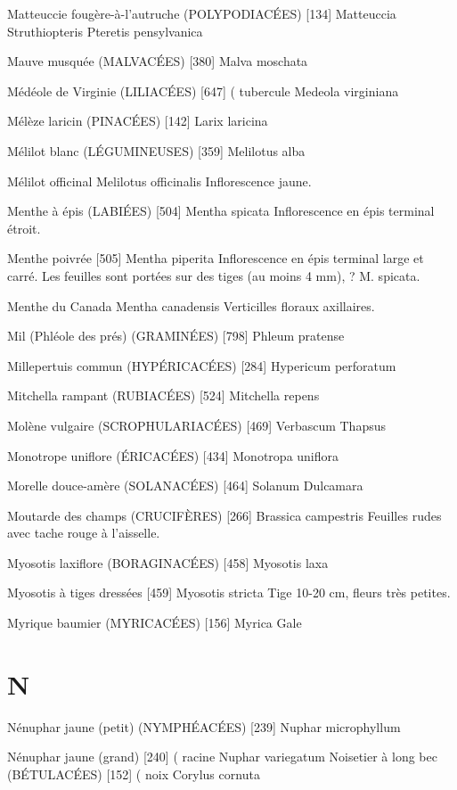 Matteuccie fougère-à-l’autruche (POLYPODIACÉES)  [134]
				Matteuccia Struthiopteris
				Pteretis pensylvanica

Mauve musquée (MALVACÉES)  [380]
				Malva moschata

Médéole de Virginie (LILIACÉES)  [647]			( tubercule
				Medeola virginiana

Mélèze laricin (PINACÉES) [142]
				Larix laricina

Mélilot blanc (LÉGUMINEUSES)  [359]
				Melilotus alba

Mélilot officinal
				Melilotus officinalis
Inflorescence jaune.

Menthe à épis (LABIÉES)  [504]
				Mentha spicata
Inflorescence en épis terminal étroit.

Menthe poivrée  [505]
				Mentha piperita
Inflorescence en épis terminal large et carré. Les feuilles sont portées sur des tiges (au moins 4 mm), ? M. spicata.

Menthe du Canada
				Mentha canadensis
Verticilles floraux axillaires.

Mil (Phléole des prés) (GRAMINÉES)  [798]
				Phleum pratense

Millepertuis commun (HYPÉRICACÉES)  [284]
				Hypericum perforatum

Mitchella rampant (RUBIACÉES)  [524]
				Mitchella repens

Molène vulgaire (SCROPHULARIACÉES)  [469]
				Verbascum Thapsus

Monotrope uniflore (ÉRICACÉES)  [434]
				Monotropa uniflora

Morelle douce-amère (SOLANACÉES)  [464]
				Solanum Dulcamara

Moutarde des champs (CRUCIFÈRES)  [266]
				Brassica campestris
Feuilles rudes avec tache rouge à l’aisselle.

Myosotis laxiflore (BORAGINACÉES)  [458]
				Myosotis laxa

Myosotis à tiges dressées  [459]
				Myosotis stricta
Tige 10-20 cm, fleurs très petites.

Myrique baumier (MYRICACÉES)  [156]
				Myrica Gale

\chapter*{N}

Nénuphar jaune (petit) (NYMPHÉACÉES)  [239]
				Nuphar microphyllum

Nénuphar jaune (grand)  [240]				( racine
				Nuphar variegatum
Noisetier à long bec (BÉTULACÉES)  [152]		( noix
				Corylus cornuta

